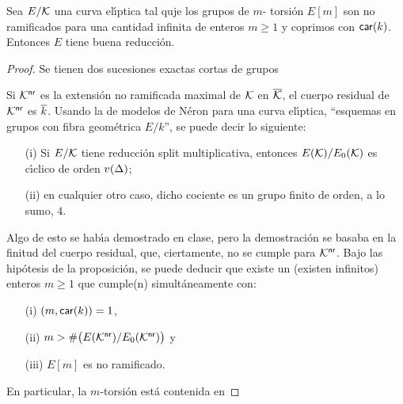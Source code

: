\begin{propoTorsionNoRamificada}\label{propo:torsionnoramificada}
	Sea $E/\cal K$ una curva el\'{\i}ptica tal quje los grupos de $m$-%
	torsi\'{o}n $E[m]$ son no ramificados para una cantidad infinita de
	enteros $m\geq 1$ y coprimos con $\char k$. Entonces
	$E$ tiene buena reducci\'{o}n.
\end{propoTorsionNoRamificada}

\begin{proof}
	Se tienen dos sucesiones exactas cortas de grupos
	\begin{center}
	\end{center}
	Si $\closnr{\cal K}$ es la extensi\'{o}n no ramificada maximal de
	$\cal K$ en $\clos{\cal K}$, el cuerpo residual de $\closnr{\cal K}$ es
	$\clos k$. Usando la de modelos de N\'{e}ron para una curva
	el\'{\i}ptica, ``esquemas en grupos con fibra geom\'{e}trica $E/k$'',
	se puede decir lo siguiente:
	\begin{itemize}
		\item[(i)] Si $E/\cal K$ tiene reducci\'{o}n split
			multiplicativa, entonces $E(\cal K)/E_0(\cal K)$ es
			c\'{\i}clico de orden $v(\discriminante)$;
		\item[(ii)] en cualquier otro caso, dicho cociente es un grupo
			finito de orden, a lo sumo, $4$.
	\end{itemize}
	Algo de esto se hab\'{\i}a demostrado en clase, pero la
	demostraci\'{o}n se basaba en la finitud del cuerpo residual, que,
	ciertamente, no se cumple para $\closnr{\cal K}$. Bajo las
	hip\'{o}tesis de la proposici\'{o}n, se puede deducir que existe un
	(existen infinitos) enteros $m\geq 1$ que cumple(n) simult\'{a}neamente
	con:
	\begin{itemize}
		\item[(i)] $(m,\char k)=1$,
		\item[(ii)]
			\begin{math}
				m>\#\big(E(\closnr{\cal K})/
					E_0(\closnr{\cal K})\big)
			\end{math} y
		\item[(iii)] $E[m]$ es no ramificado.
	\end{itemize}
	En particular, la $m$-torsi\'{o}n est\'{a} contenida en

\end{proof}
